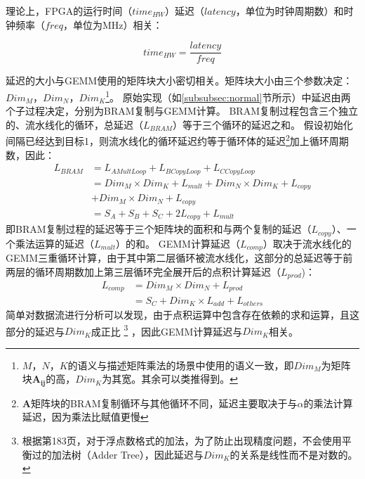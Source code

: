理论上，FPGA的运行时间（$time_{HW}$）延迟（$latency$，单位为时钟周期数）和时钟频率（$freq$，单位为MHz）相关：

\begin{equation}\label{eq:timelatency}
time_{HW}=\frac{latency}{freq}
\end{equation}

延迟的大小与GEMM使用的矩阵块大小密切相关。矩阵块大小由三个参数决定：$Dim_M$，$Dim_N$，$Dim_K$\footnote{$M$，$N$，$K$的语义与描述矩阵乘法的场景中使用的语义一致，即$Dim_M$为矩阵块$\mathbf{A_{ij}}$的高，$Dim_K$为其宽。其余可以类推得到。}。
原始实现（如\ref{subsubsec:normal}节所示）中延迟由两个子过程决定，分别为BRAM复制与GEMM计算。
BRAM复制过程包含三个独立的、流水线化的循环，总延迟（\(\mathit{L_{BRAM}}\)）等于三个循环的延迟之和。
假设初始化间隔已经达到目标1，则流水线化的循环延迟约等于循环体的延迟\footnote{\(\mathbf{A}\)矩阵块的BRAM复制循环与其他循环不同，延迟主要取决于与\(\alpha\)的乘法计算延迟，因为乘法比赋值更慢}加上循环周期数，因此：
\begin{equation}\label{eq:bramcopylatency}
\begin{aligned}
\mathit{L_{BRAM}}
& = \mathit{L_{AMultLoop}+L_{BCopyLoop}+L_{CCopyLoop}} \\
& = \mathit{Dim_M\times Dim_K + L_{mult}} 
  + \mathit{Dim_N\times Dim_K + L_{copy}} \\
& + \mathit{Dim_M\times Dim_N + L_{copy}} \\
& = \mathit{S_A + S_B + S_C + 2L_{copy} + L_{mult}} 
\end{aligned}
\end{equation}
即BRAM复制过程的延迟等于三个矩阵块的面积和与两个复制的延迟（\(\mathit{L_{copy}}\)）、一个乘法运算的延迟（\(\mathit{L_{mult}}\)）的和。
GEMM计算延迟（\(\mathit{L_{comp}}\)）取决于流水线化的GEMM三重循环计算，由于其中第二层循环被流水线化，这部分的总延迟等于前两层的循环周期数加上第三层循环完全展开后的点积计算延迟（\(\mathit{L_{prod}}\))：
\begin{equation}\label{eq:complatency}
\begin{aligned}
\mathit{L_{comp}}
& = \mathit{Dim_M \times Dim_N + L_{prod}} \\
& = \mathit{S_C + Dim_K \times L_{add} + L_{others}}
\end{aligned}
\end{equation}
简单对数据流进行分析可以发现，由于点积运算中包含存在依赖的求和运算，且这部分的延迟与\(\mathit{Dim_K}\)成正比
\footnote{根据\cite{ug902}第183页，对于浮点数格式的加法，为了防止出现精度问题，不会使用平衡过的加法树（Adder Tree），因此延迟与\(Dim_K\)的关系是线性而不是对数的。}
，因此GEMM计算延迟与\(\mathit{Dim_K}\)相关。

